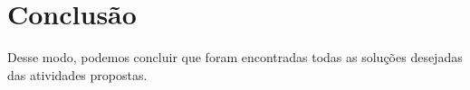 \documentclass[
	12pt,				%
	openright,			%
	twoside,			%
	a4paper,			%
	english,			%
	french,				%
	spanish,			%
	brazil,				%
	]{abntex2}
\begin{document}



\chapter{Conclusão}

Desse modo, podemos concluir que foram encontradas todas as soluções desejadas das atividades propostas.

\postextual



%
%
\end{document}
